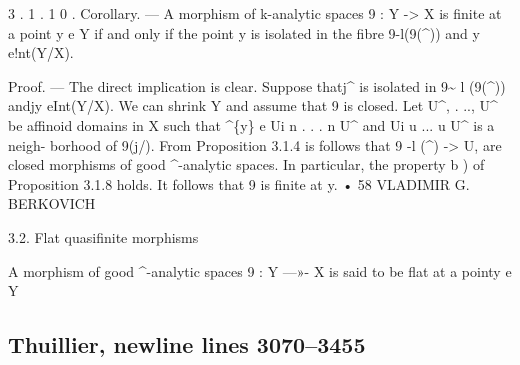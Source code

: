 \documentclass[
  10pt,
]{article}
\newenvironment{Shaded}{}{}
\newcommand{\NormalTok}[1]{#1}
\begin{document}
\begin{Shaded}
\begin{Highlighting}[]
\NormalTok{      3 . 1 . 1 0 . Corollary. — A morphism of k{-}analytic spaces 9 : Y {-}\textgreater{} X is finite at a point}
\NormalTok{y e Y if and only if the point y is isolated in the fibre 9{-}\textquotesingle{}l(9(\^{})) and y e!nt(Y/X).}

\NormalTok{       Proof. — The direct implication is clear. Suppose thatj\^{} is isolated in 9\textasciitilde{} l (9(\^{}))}
\NormalTok{andjy eInt(Y/X). We can shrink Y and assume that 9 is closed. Let U\^{}, . .., U\^{} be}
\NormalTok{affinoid domains in X such that \^{}\{y\} e Ui n . . . n U\^{} and Ui u ... u U\^{} is a neigh{-}}
\NormalTok{borhood of 9(j/). From Proposition 3.1.4 is follows that 9 {-}l (\^{}) {-}\textgreater{} U, are closed}
\NormalTok{morphisms of good \^{}{-}analytic spaces. In particular, the property b ) of Proposition 3.1.8}
\NormalTok{holds. It follows that 9 is finite at y. •}
\NormalTok{58                                VLADIMIR G. BERKOVICH}


\NormalTok{3.2. Flat quasifinite morphisms}

\NormalTok{      A morphism of good \^{}{-}analytic spaces 9 : Y —»{-} X is said to be flat at a pointy e Y}
\end{Highlighting}
\end{Shaded}

\subsection{Thuillier, newline lines
3070--3455}\label{thuillier-newline-lines-30703455}
\end{document}
